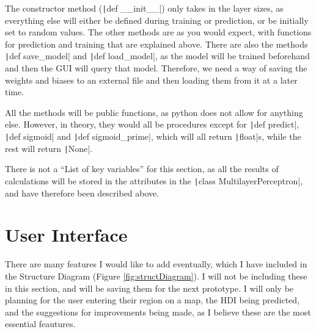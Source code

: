 \documentclass[12pt]{report}
\newcommand{\pil}[1]{\texttt|#1|}
\begin{document}
The constructor method (\pil{def __init__}) only takes in the layer sizes, as everything else will either be defined during training or prediction, or be initially set to random values. The other methods are as you would expect, with functions for prediction and training that are explained above. There are also the methods \pil{def save_model} and \pil{def load_model}, as the model will be trained beforehand and then the GUI will query that model. Therefore, we need a way of saving the weights and biases to an external file and then loading them from it at a later time.

All the methods will be public functions, as python does not allow for anything else. However, in theory, they would all be procedures except for \pil{def predict}, \pil{def sigmoid} and \pil{def sigmoid_prime}, which will all return \pil{float}s, while the rest will return \pil{None}.

There is not a ``List of key variables'' for this section, as all the results of calculations will be stored in the attributes in the \pil{class MultilayerPerceptron}, and have therefore been described above.

\section{User Interface}\label{sec:ui}
There are many features I would like to add eventually, which I have included in the Structure Diagram (Figure \ref{fig:structDiagram}). I will not be including these in this section, and will be saving them for the next prototype. I will only be planning for the user entering their region on a map, the HDI being predicted, and the suggestions for improvements being made, as I believe these are the most essential feautures.
\end{document}
